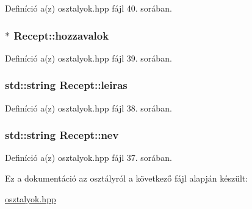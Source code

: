 Definíció a(z) osztalyok.\+hpp fájl 40. sorában.

\subsubsection[{\texorpdfstring{hozzavalok}{hozzavalok}}]{$\ast$ Recept\+::hozzavalok\hspace{0.3cm}{\ttfamily [private]}}\hypertarget{classRecept_afb5204c5461622e25fd7c89da9874c01}{}\label{classRecept_afb5204c5461622e25fd7c89da9874c01}


Definíció a(z) osztalyok.\+hpp fájl 39. sorában.

\subsubsection[{\texorpdfstring{leiras}{leiras}}]{\setlength{\rightskip}{0pt plus 5cm}std\+::string Recept\+::leiras\hspace{0.3cm}{\ttfamily [private]}}\hypertarget{classRecept_ab45575aab9abd31171cd35eb74665389}{}\label{classRecept_ab45575aab9abd31171cd35eb74665389}


Definíció a(z) osztalyok.\+hpp fájl 38. sorában.

\subsubsection[{\texorpdfstring{nev}{nev}}]{\setlength{\rightskip}{0pt plus 5cm}std\+::string Recept\+::nev\hspace{0.3cm}{\ttfamily [private]}}\hypertarget{classRecept_afdc9105fc79f5027da1aebb6fd908b78}{}\label{classRecept_afdc9105fc79f5027da1aebb6fd908b78}


Definíció a(z) osztalyok.\+hpp fájl 37. sorában.



Ez a dokumentáció az osztályról a következő fájl alapján készült\+:\begin{DoxyCompactItemize}
\item 
\hyperlink{osztalyok_8hpp}{osztalyok.\+hpp}\end{DoxyCompactItemize}
